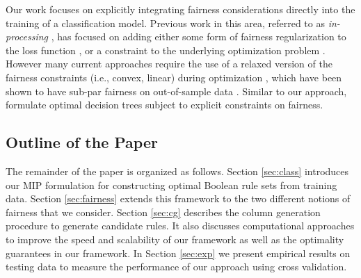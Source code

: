 \documentclass[twoside,11pt]{article}
\begin{document}
Our work focuses on  explicitly integrating fairness considerations directly into the training of a classification model. Previous work in this area, referred to as \emph{in-processing} \citep{agarwal2018reductions,calders2010,kamishima2012fairness,zafar2015fairness,celis2019classification,Zafar_2017,donini2018empirical,berk2017convex,wu2018fairnessaware,pmlr-v119-lohaus20a}, has focused on adding either some form of fairness regularization to the loss function \citep{kamishima2012fairness,berk2017convex, pmlr-v28-zemel13}, or a constraint to the underlying optimization problem \citep{aghaei2019learning, zafar2015fairness, Zafar_2017,donini2018empirical}. However many current approaches require the use of a relaxed version of the fairness constraints (i.e., convex, linear) during optimization \citep{donini2018empirical, wu2018fairnessaware, zafar2015fairness, Zafar_2017}, which have been shown to have sub-par fairness on out-of-sample data \citep{pmlr-v119-lohaus20a}. Similar to our approach, \cite{aghaei2019learning} formulate optimal decision trees subject to explicit constraints on fairness. 

\subsection{Outline of the Paper}\label{sec:outline}

The remainder of the paper is organized as follows. Section \ref{sec:class} introduces our MIP formulation for constructing optimal Boolean rule sets from training data. Section \ref{sec:fairness} extends this framework to the two different notions of fairness that we consider. Section \ref{sec:cg} describes the column generation procedure to generate candidate rules. It also discusses  computational approaches to improve the speed and scalability of our framework as well as the optimality guarantees in our framework. In Section \ref{sec:exp}  we present empirical results on testing data to measure the performance of our approach using cross validation.


% 
\end{document}
